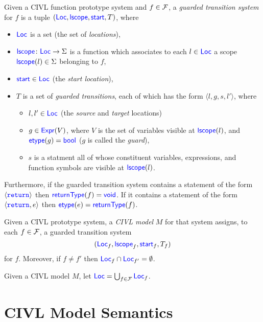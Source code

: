\documentclass[11pt]{article}
\begin{document}
\begin{definition}
  Given a CIVL function prototype system and $f\in\Func$,
  a \emph{guarded transition system} for $f$ 
  is a tuple $(\Loc,\lscope,\start, T)$, where
  \begin{itemize}
  \item $\Loc$ is a set (the set of \emph{locations}),
  \item $\lscope\colon\Loc\ra\Sigma$ is a function which associates
    to each $l\in\Loc$ a scope $\lscope(l)\in\Sigma$ belonging to $f$,
  \item $\start\in\Loc$ (the \emph{start location}),
  \item $T$ is a set of \emph{guarded transitions}, each of which has
    the form $\langle l,g,s,l'\rangle$, where
    \begin{itemize}
    \item $l,l'\in\Loc$ (the \emph{source} and \emph{target}
      locations)
    \item $g\in\Expr(V)$, where $V$ is the set of variables visible at
      $\lscope(l)$, and $\etype(g)=\bool$ ($g$ is called the
      \emph{guard}),
    \item $s$ is a statment all of whose constituent variables,
      expressions, and function symbols are visible at $\lscope(l)$.
    \end{itemize}
  \end{itemize}
  Furthermore, if the guarded transition system contains a statement
  of the form $\langle\code{return}\rangle$ then
  $\returntype(f)=\void$.  If it contains a statement of the form
  $\langle\code{return},e\rangle$ then $\etype(e)=\returntype(f)$.
\end{definition}

\begin{definition}
  Given a CIVL prototype system, a \emph{CIVL model} $M$ for that
  system assigns, to each $f\in\Func$, a guarded transition system
  \[(\Loc_f,\lscope_f, \start_f,T_f)\] for $f$.  Moreover, if $f\neq f'$
  then
  $\Loc_f\cap\Loc_{f'}=\emptyset$.
\end{definition}

\begin{definition}
  Given a CIVL model $M$, let $\Loc=\bigcup_{f\in\Func}\Loc_f$.
\end{definition}

\section{CIVL Model Semantics}
\label{sec:semantics}
\end{document}

